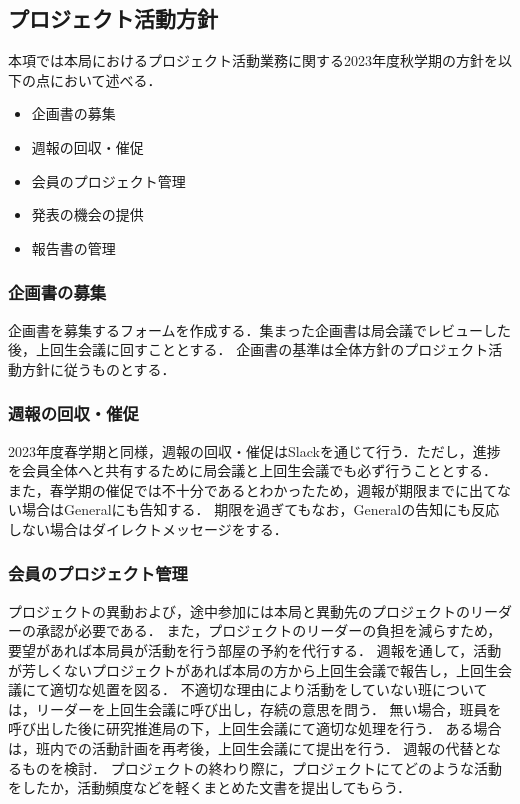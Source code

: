 \subsection*{プロジェクト活動方針}


本項では本局におけるプロジェクト活動業務に関する2023年度秋学期の方針を以下の点において述べる．

\begin{itemize}
  \item 企画書の募集
  \item 週報の回収・催促
  \item 会員のプロジェクト管理
  \item 発表の機会の提供
  \item 報告書の管理
\end{itemize}

\subsubsection*{企画書の募集}

企画書を募集するフォームを作成する．集まった企画書は局会議でレビューした後，上回生会議に回すこととする．
企画書の基準は全体方針のプロジェクト活動方針に従うものとする．

\subsubsection*{週報の回収・催促}

2023年度春学期と同様，週報の回収・催促はSlackを通じて行う．ただし，進捗を会員全体へと共有するために局会議と上回生会議でも必ず行うこととする．
また，春学期の催促では不十分であるとわかったため，週報が期限までに出てない場合はGeneralにも告知する．
期限を過ぎてもなお，Generalの告知にも反応しない場合はダイレクトメッセージをする．

\subsubsection*{会員のプロジェクト管理}

プロジェクトの異動および，途中参加には本局と異動先のプロジェクトのリーダーの承認が必要である．
また，プロジェクトのリーダーの負担を減らすため，要望があれば本局員が活動を行う部屋の予約を代行する．
週報を通して，活動が芳しくないプロジェクトがあれば本局の方から上回生会議で報告し，上回生会議にて適切な処置を図る．
不適切な理由により活動をしていない班については，リーダーを上回生会議に呼び出し，存続の意思を問う．
無い場合，班員を呼び出した後に研究推進局の下，上回生会議にて適切な処理を行う．
ある場合は，班内での活動計画を再考後，上回生会議にて提出を行う．
週報の代替となるものを検討．
プロジェクトの終わり際に，プロジェクトにてどのような活動をしたか，活動頻度などを軽くまとめた文書を提出してもらう．

